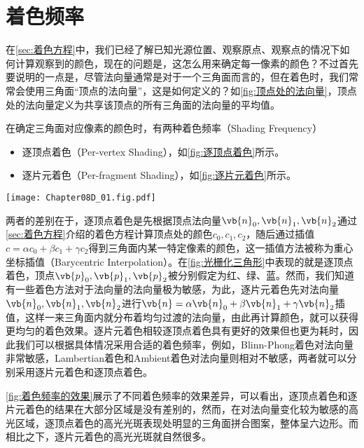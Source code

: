 \section{着色频率}



在\cref{sec:着色方程}中，我们已经了解已知光源位置、观察原点、观察点的情况下如何计算观察到的颜色，现在的问题是，这怎么用来确定每一像素的颜色？不过首先要说明的一点是，尽管法向量通常是对于一个三角面而言的，但在着色时，我们常常会使用三角面“顶点的法向量”，这是如何定义的？如\cref{fig:顶点处的法向量}，顶点处的法向量定义为共享该顶点的所有三角面的法向量的平均值。

在确定三角面对应像素的颜色时，有两种着色频率（Shading Frequency）
\begin{itemize}
    \item 逐顶点着色（Per-vertex Shading），如\cref{fig:逐顶点着色}所示。
    \item 逐片元着色（Per-fragment Shading），如\cref{fig:逐片元着色}所示。
\end{itemize}

\begin{Figure}[顶点处的法向量]
    \texttt{[image: Chapter08D\_01.fig.pdf]}
\end{Figure}

\begin{Figure}[着色频率]
\end{Figure}

\begin{Figure}[着色频率的效果]
\end{Figure}

两者的差别在于，逐顶点着色是先根据顶点法向量$\vb{n}_0,\vb{n}_1,\vb{n}_2$通过\cref{sec:着色方程}介绍的着色方程计算顶点处的颜色$c_0,c_1,c_2$，随后通过插值$c=\alpha c_0+\beta c_1+\gamma c_2$得到三角面内某一特定像素的颜色，这一插值方法被称为重心坐标插值（Barycentric Interpolation）。在\cref{fig:光栅化三角形}中表现的就是逐顶点着色，顶点$\vb{p}_0,\vb{p}_1,\vb{p}_2$被分别假定为红、绿、蓝。然而，我们知道有一些着色方法对于法向量的法向量极为敏感，为此，逐片元着色先对法向量$\vb{n}_0,\vb{n}_1,\vb{n}_2$进行$\vb{n}=\alpha\vb{n}_0+\beta\vb{n}_1+\gamma\vb{n}_2$插值，这样一来三角面内就分布着均匀过渡的法向量，由此再计算颜色，就可以获得更均匀的着色效果。逐片元着色相较逐顶点着色具有更好的效果但也更为耗时，因此我们可以根据具体情况采用合适的着色频率，例如，Blinn-Phong着色对法向量非常敏感，Lambertian着色和Ambient着色对法向量则相对不敏感，两者就可以分别采用逐片元着色和逐顶点着色。

\cref{fig:着色频率的效果}展示了不同着色频率的效果差异，可以看出，逐顶点着色和逐片元着色的结果在大部分区域是没有差别的，然而，在对法向量变化较为敏感的高光区域，逐顶点着色的高光光斑表现处明显的三角面拼合图案，整体呈六边形。而相比之下，逐片元着色的高光光斑就自然很多。
